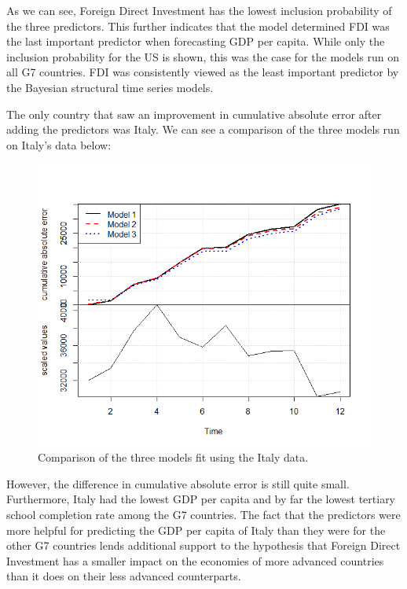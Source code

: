\documentclass{article}
\begin{document}
As we can see, Foreign Direct Investment has the lowest inclusion probability of the three predictors. This further indicates that the model determined FDI was the last important predictor when forecasting GDP per capita. While only the inclusion probability for the US is shown, this was the case for the models run on all G7 countries. FDI was consistently viewed as the least important predictor by the Bayesian structural time series models.

The only country that saw an improvement in cumulative absolute error after adding the predictors was Italy. We can see a comparison of the three models run on Italy's data below:

\begin{figure}[H]
	\centering
	\includegraphics[width=\linewidth]{Italy_Model3.png}
	\caption{Comparison of the three models fit using the Italy data.}
	\label{fig:pairs}
\end{figure}

However, the difference in cumulative absolute error is still quite small. Furthermore, Italy had the lowest GDP per capita and by far the lowest tertiary school completion rate among the G7 countries. The fact that the predictors were more helpful for predicting the GDP per capita of Italy than they were for the other G7 countries lends additional support to the hypothesis that Foreign Direct Investment has a smaller impact on the economies of more advanced countries than it does on their less advanced counterparts.
\end{document}
